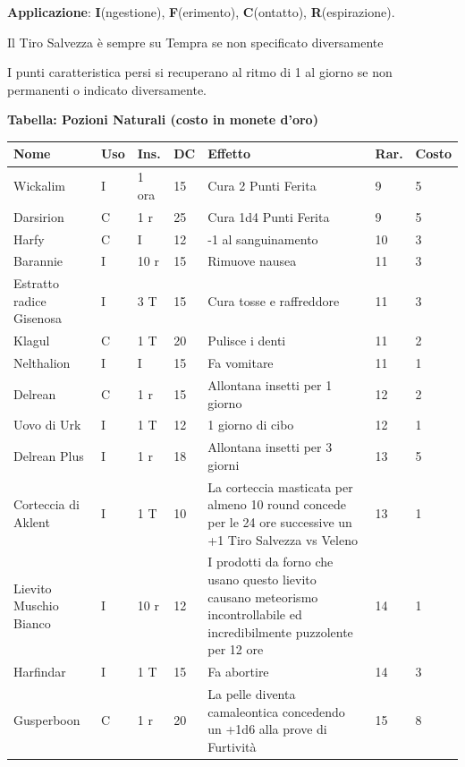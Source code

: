 \medskip

\textbf{Applicazione}: \textbf{I}(ngestione), \textbf{F}(erimento), \textbf{C}(ontatto), \textbf{R}(espirazione).

Il Tiro Salvezza è sempre su Tempra se non specificato diversamente

I punti caratteristica persi si recuperano al ritmo di 1 al giorno se non permanenti o indicato diversamente.

\medskip

\textbf{Tabella: Pozioni Naturali (costo in monete d'oro)}\label{tabellapozioni}

\medskip

\noindent\begin{xltabular}{\linewidth}{llllXll}
	\toprule
 \textbf{Nome}& \textbf{Uso} & \textbf{Ins.} & \textbf{DC} & \textbf{Effetto}& \textbf{Rar.} & \textbf{Costo} \\
 	\toprule
	Wickalim & I& 1 ora& 15& Cura 2 Punti Ferita& 9 & 5 \\
 Darsirion & C& 1 r & 25& Cura 1d4 Punti Ferita& 9 & 5 \\
	Harfy & C& I & 12& -1 al sanguinamento& 10 & 3 \\
 Barannie & I& 10 r& 15& Rimuove nausea & 11 & 3 \\
	Estratto radice Gisenosa & I& 3 T& 15& Cura tosse e raffreddore& 11 & 3\\
 Klagul & C& 1 T & 20& Pulisce i denti & 11 & 2 \\
	Nelthalion & I& I& 15& Fa vomitare& 11 & 1\\
 Delrean & C& 1 r & 15& Allontana insetti per 1 giorno & 12 & 2\\
	Uovo di Urk & I& 1 T & 12& 1 giorno di cibo& 12 & 1\\
 Delrean Plus & I& 1 r & 18& Allontana insetti per 3 giorni & 13 & 5\\
	Corteccia di Aklent & I& 1 T & 10& La corteccia masticata per almeno 10 round concede per le 24 ore successive un +1 Tiro Salvezza vs Veleno& 13 & 1\\
 Lievito Muschio Bianco & I& 10 r& 12& I prodotti da forno che usano questo lievito causano meteorismo incontrollabile ed incredibilmente puzzolente per 12 ore & 14 & 1\\
	Harfindar & I& 1 T & 15& Fa abortire& 14 & 3 \\
 Gusperboon & C& 1 r & 20& La pelle diventa camaleontica concedendo un +1d6 alla prove di Furtività & 15 & 8\\

\end{xltabular}
